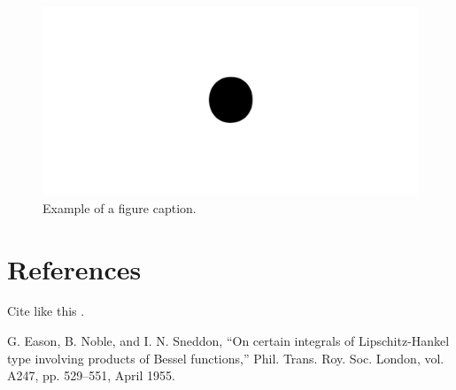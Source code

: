 \documentclass[conference]{IEEEtran}
\begin{document}
	\begin{figure}[htbp]
		\centerline{\includegraphics{figures/fig1.png}}
		\caption{Example of a figure caption.}
		\label{fig}
	\end{figure}
	
	\section*{References}
	
	Cite like this \cite{b1}.
		\begin{thebibliography}{00}
		 G. Eason, B. Noble, and I. N. Sneddon, ``On certain integrals of Lipschitz-Hankel type involving products of Bessel functions,'' Phil. Trans. Roy. Soc. London, vol. A247, pp. 529--551, April 1955.
	\end{thebibliography}
\end{document}
